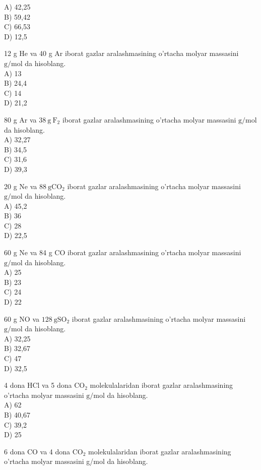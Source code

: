A) 42,25\\
B) 59,42\\
C) 66,53\\
D) 12,5
  \item 12 g He va 40 g Ar iborat gazlar aralashmasining o'rtacha molyar massasini $\mathrm{g} / \mathrm{mol}$ da hisoblang.\\
A) 13\\
B) 24,4\\
C) 14\\
D) 21,2
  \item 80 g Ar va $38 \mathrm{~g} \mathrm{~F}_{2}$ iborat gazlar aralashmasining o'rtacha molyar massasini $\mathrm{g} / \mathrm{mol}$ da hisoblang.\\
A) 32,27\\
B) 34,5\\
C) 31,6\\
D) 39,3
  \item 20 g Ne va $88 \mathrm{~g} \mathrm{CO}_{2}$ iborat gazlar aralashmasining o'rtacha molyar massasini $\mathrm{g} / \mathrm{mol}$ da hisoblang.\\
A) 45,2\\
B) 36\\
C) 28\\
D) 22,5
  \item 60 g Ne va 84 g CO iborat gazlar aralashmasining o'rtacha molyar massasini $\mathrm{g} / \mathrm{mol}$ da hisoblang.\\
A) 25\\
B) 23\\
C) 24\\
D) 22
  \item 60 g NO va $128 \mathrm{~g} \mathrm{SO}_{2}$ iborat gazlar aralashmasining o'rtacha molyar massasini $\mathrm{g} / \mathrm{mol}$ da hisoblang.\\
A) 32,25\\
B) 32,67\\
C) 47\\
D) 32,5
  \item 4 dona HCl va 5 dona $\mathrm{CO}_{2}$ molekulalaridan iborat gazlar aralashmasining o'rtacha molyar massasini $\mathrm{g} / \mathrm{mol}$ da hisoblang.\\
A) 62\\
B) 40,67\\
C) 39,2\\
D) 25\\
  \item 6 dona CO va 4 dona $\mathrm{CO}_{2}$ molekulalaridan iborat gazlar aralashmasining o'rtacha molyar massasini g/mol da hisoblang.\\
